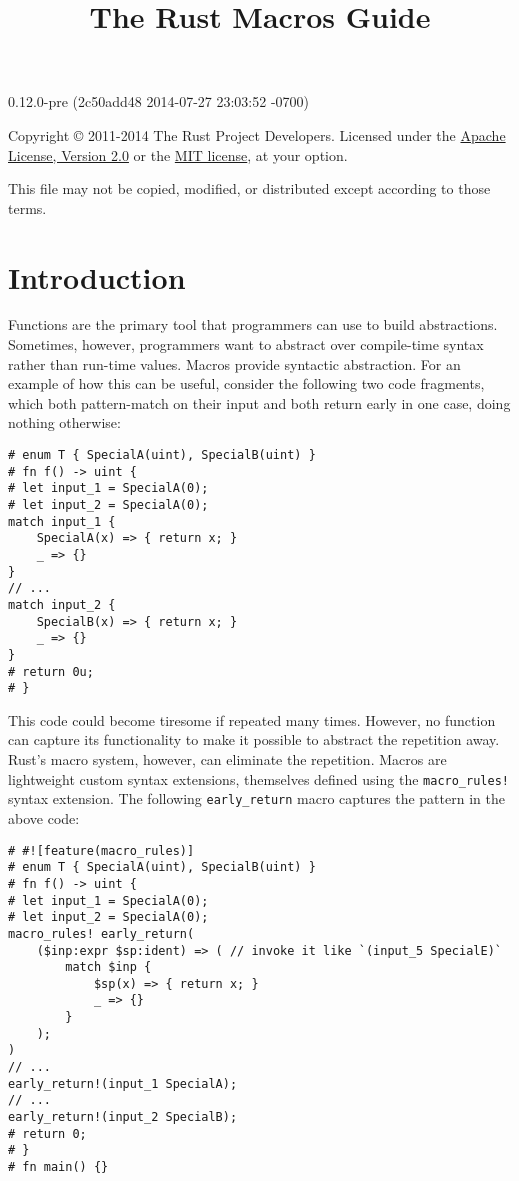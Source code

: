\documentclass[]{article}
\title{The Rust Macros Guide}
\begin{document}
\maketitle

0.12.0-pre (2c50add48 2014-07-27 23:03:52 -0700)

Copyright © 2011-2014 The Rust Project Developers. Licensed under the
\href{http://www.apache.org/licenses/LICENSE-2.0}{Apache License,
Version 2.0} or the \href{http://opensource.org/licenses/MIT}{MIT
license}, at your option.

This file may not be copied, modified, or distributed except according
to those terms.

{
\hypersetup{linkcolor=black}
\setcounter{tocdepth}{3}
\tableofcontents
}
\section{Introduction}\label{introduction}

Functions are the primary tool that programmers can use to build
abstractions. Sometimes, however, programmers want to abstract over
compile-time syntax rather than run-time values. Macros provide
syntactic abstraction. For an example of how this can be useful,
consider the following two code fragments, which both pattern-match on
their input and both return early in one case, doing nothing otherwise:

\begin{verbatim}
# enum T { SpecialA(uint), SpecialB(uint) }
# fn f() -> uint {
# let input_1 = SpecialA(0);
# let input_2 = SpecialA(0);
match input_1 {
    SpecialA(x) => { return x; }
    _ => {}
}
// ...
match input_2 {
    SpecialB(x) => { return x; }
    _ => {}
}
# return 0u;
# }
\end{verbatim}

This code could become tiresome if repeated many times. However, no
function can capture its functionality to make it possible to abstract
the repetition away. Rust's macro system, however, can eliminate the
repetition. Macros are lightweight custom syntax extensions, themselves
defined using the \texttt{macro\_rules!} syntax extension. The following
\texttt{early\_return} macro captures the pattern in the above code:

\begin{verbatim}
# #![feature(macro_rules)]
# enum T { SpecialA(uint), SpecialB(uint) }
# fn f() -> uint {
# let input_1 = SpecialA(0);
# let input_2 = SpecialA(0);
macro_rules! early_return(
    ($inp:expr $sp:ident) => ( // invoke it like `(input_5 SpecialE)`
        match $inp {
            $sp(x) => { return x; }
            _ => {}
        }
    );
)
// ...
early_return!(input_1 SpecialA);
// ...
early_return!(input_2 SpecialB);
# return 0;
# }
# fn main() {}
\end{verbatim}
\end{document}
